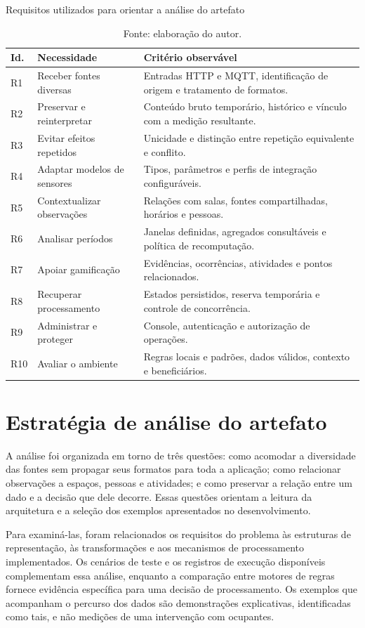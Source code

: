 \documentclass[tcc,capa]{texufpel}
\begin{document}
\begin{table}[htbp]\centering\small
\caption{Requisitos utilizados para orientar a análise do artefato}\label{tab:requisitos}
\begin{tabularx}{\textwidth}{p{0.7cm}p{3.2cm}Y}\toprule
Id. & Necessidade & Critério observável \\\midrule
R1 & Receber fontes diversas & Entradas HTTP e MQTT, identificação de origem e tratamento de formatos. \\
R2 & Preservar e reinterpretar & Conteúdo bruto temporário, histórico e vínculo com a medição resultante. \\
R3 & Evitar efeitos repetidos & Unicidade e distinção entre repetição equivalente e conflito. \\
R4 & Adaptar modelos de sensores & Tipos, parâmetros e perfis de integração configuráveis. \\
R5 & Contextualizar observações & Relações com salas, fontes compartilhadas, horários e pessoas. \\
R6 & Analisar períodos & Janelas definidas, agregados consultáveis e política de recomputação. \\
R7 & Apoiar gamificação & Evidências, ocorrências, atividades e pontos relacionados. \\
R8 & Recuperar processamento & Estados persistidos, reserva temporária e controle de concorrência. \\
R9 & Administrar e proteger & Console, autenticação e autorização de operações. \\
R10 & Avaliar o ambiente & Regras locais e padrões, dados válidos, contexto e beneficiários. \\\bottomrule
\end{tabularx}
\caption*{Fonte: elaboração do autor.}
\end{table}

\section{Estratégia de análise do artefato}\label{sec:versoes}
A análise foi organizada em torno de três questões: como acomodar a diversidade das fontes sem propagar seus formatos para toda a aplicação; como relacionar observações a espaços, pessoas e atividades; e como preservar a relação entre um dado e a decisão que dele decorre. Essas questões orientam a leitura da arquitetura e a seleção dos exemplos apresentados no desenvolvimento.

Para examiná-las, foram relacionados os requisitos do problema às estruturas de representação, às transformações e aos mecanismos de processamento implementados. Os cenários de teste e os registros de execução disponíveis complementam essa análise, enquanto a comparação entre motores de regras fornece evidência específica para uma decisão de processamento. Os exemplos que acompanham o percurso dos dados são demonstrações explicativas, identificadas como tais, e não medições de uma intervenção com ocupantes.
\end{document}
